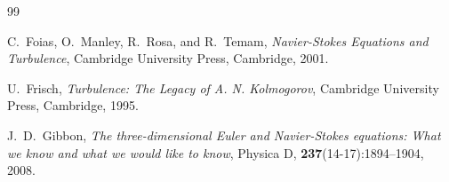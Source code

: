 \documentclass[11pt,a4paper]{article}
\theoremstyle{definition}
\begin{document}
\begin{thebibliography}{99}

C.~Foias, O.~Manley, R.~Rosa, and R.~Temam,
\textit{Navier-Stokes Equations and Turbulence},
Cambridge University Press, Cambridge, 2001.

U.~Frisch,
\textit{Turbulence: The Legacy of A. N. Kolmogorov},
Cambridge University Press, Cambridge, 1995.

J.~D.~Gibbon,
\textit{The three-dimensional Euler and Navier-Stokes equations: What we know and what we would like to know},
Physica D, \textbf{237}(14-17):1894--1904, 2008.

\end{thebibliography}
\end{document}
